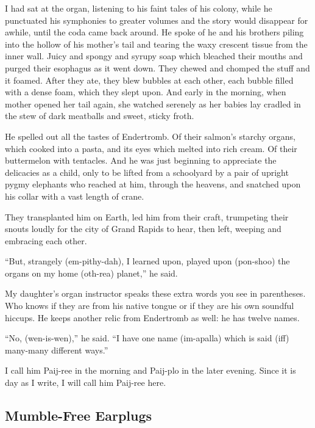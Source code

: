 \documentclass[12pt,twoside]{report}
\begin{document}
I had sat at the organ, listening to his faint tales of his colony,
while he punctuated his symphonies to greater volumes and the story
would disappear for awhile, until the coda came back around. He spoke
of he and his brothers piling into the hollow of his mother's tail and
tearing the waxy crescent tissue from the inner wall.  Juicy and
spongy and syrupy soap which bleached their mouths and purged their
esophagus as it went down.  They chewed and chomped the stuff and it
foamed.  After they ate, they blew bubbles at each other, each bubble
filled with a dense foam, which they slept upon.  And early in the
morning, when mother opened her tail again, she watched serenely as
her babies lay cradled in the stew of dark meatballs and sweet, sticky
froth.

He spelled out all the tastes of Endertromb.  Of their salmon's
starchy organs, which cooked into a pasta, and its eyes which melted
into rich cream.  Of their buttermelon with tentacles. And he was just
beginning to appreciate the delicacies as a child, only to be lifted
from a schoolyard by a pair of upright pygmy elephants who reached at
him, through the heavens, and snatched upon his collar with a vast
length of crane.

They transplanted him on Earth, led him from their craft, trumpeting
their snouts loudly for the city of Grand Rapids to hear, then left,
weeping and embracing each other.

``But, strangely (em-pithy-dah), I learned upon, played upon
(pon-shoo) the organs on my home (oth-rea) planet,'' he said.

My daughter's organ instructor speaks these extra words you see in
parentheses.  Who knows if they are from his native tongue or if they
are his own soundful hiccups.  He keeps another relic from Endertromb
as well: he has twelve names.

``No, (wen-is-wen),'' he said.  ``I have one name (im-apalla) which is
said (iff) many-many different ways.''

I call him Paij-ree in the morning and Paij-plo in the later
evening. Since it is day as I write, I will call him Paij-ree here.



\subsection{Mumble-Free Earplugs}



\end{document}
